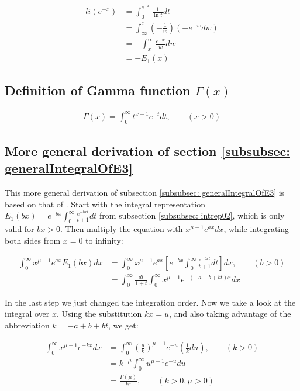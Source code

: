 \documentclass[bibliography=totocnumbered]{scrartcl}
\newcommand{\assume}[1][\text{MISSING PARAMETER}]{,\qquad\left(#1\right)}
\begin{document}
			\begin{align}
			li\left(e^{-x}\right)&=\int_{0}^{e^{-x}}\frac{1}{\ln{t}}dt\\
			&=\int_{\infty}^{x}\left(-\frac{1}{w}\right)\left(-e^{-w}dw\right)\\
			&=-\int_{x}^{\infty}\frac{e^{-w}}{w}dw\\
			&=-E_1\left(x\right)
			\end{align}
		
		\subsection[Definition of Gamma function]{Definition of Gamma function $\Gamma\left(x\right)$}
		\label{appsubsec: Gamma}
		
			\begin{gather}
			\Gamma\left(x\right)=\int_{0}^{\infty}t^{x-1}e^{-t}dt\assume[x>0]\label{eq: Gamma}
			\end{gather}
		
		\subsection{More general derivation of section \ref{subsubsec: generalIntegralOfE3}}
		\label{appsec: moreGeneralDerivation1}
		
			This more general derivation of subsection \ref{subsubsec: generalIntegralOfE3} is based on that of \autocite[73\psq]{schloemilch}. Start with the integral representation $E_1\left(bx\right)=e^{-bx}\int_{0}^{\infty}\frac{e^{-bxt}}{t+1}dt$ from subsection \ref{subsubsec: intrep02}, which is only valid for $bx>0$. Then multiply the equation with $x^{\mu-1}e^{ax}dx$, while integrating both sides from $x=0$ to infinity:
			
			\begin{align}
			\int_{0}^{\infty}x^{\mu-1}e^{ax}E_1\left(bx\right)dx&=\int_{0}^{\infty}x^{\mu-1}e^{ax}\left[e^{-bx}\int_{0}^{\infty}\frac{e^{-bxt}}{t+1}dt\right]dx\assume[b>0]\\
			&=\int_{0}^{\infty}\frac{dt}{1+t}\int_{0}^{\infty}x^{\mu-1}e^{-\left(-a+b+bt\right)x}dx
			\end{align}
			
			In the last step we just changed the integration order. Now we take a look at the integral over $x$. Using the substitution $kx=u$, and also taking advantage of the abbreviation $k=-a+b+bt$, we get:
			
			\begin{align}
			\int_{0}^{\infty}x^{\mu-1}e^{-kx}dx&=\int_{0}^{\infty}\left(\frac{u}{k}\right)^{\mu-1}e^{-u}\left(\frac{1}{k}du\right)\assume[k>0]\\
			&=k^{-\mu}\int_{0}^{\infty}u^{\mu-1}e^{-u}du\\
			&=\frac{\Gamma\left(\mu\right)}{k^{\mu}}\assume[k>0, \mu>0]
			\end{align}
			
\end{document}
